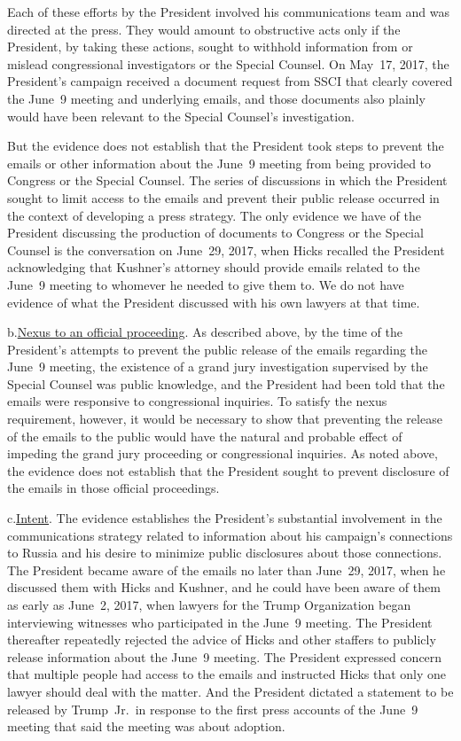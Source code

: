 Each of these efforts by the President involved his communications team and was directed at the press.
They would amount to obstructive acts only if the President, by taking these actions, sought to withhold information from or mislead congressional investigators or the Special Counsel.
On May~17, 2017, the President's campaign received a document request from SSCI that clearly covered the June~9 meeting and underlying emails, and those documents also plainly would have been relevant to the Special Counsel's investigation.

But the evidence does not establish that the President took steps to prevent the emails or other information about the June~9 meeting from being provided to Congress or the Special Counsel.
The series of discussions in which the President sought to limit access to the emails and prevent their public release occurred in the context of developing a press strategy.
The only evidence we have of the President discussing the production of documents to Congress or the Special Counsel is the conversation on June~29, 2017, when Hicks recalled the President acknowledging that Kushner's attorney should provide emails related to the June~9 meeting to whomever he needed to give them to.
We do not have evidence of what the President discussed with his own lawyers at that time.

b.\qquad\underline{Nexus to an official proceeding}.
As described above, by the time of the President's attempts to prevent the public release of the emails regarding the June~9 meeting, the existence of a grand jury investigation supervised by the Special Counsel was public knowledge, and the President had been told that the emails were responsive to congressional inquiries.
To satisfy the nexus requirement, however, it would be necessary to show that preventing the release of the emails to the public would have the natural and probable effect of impeding the grand jury proceeding or congressional inquiries.
As noted above, the evidence does not establish that the President sought to prevent disclosure of the emails in those official proceedings.

c.\qquad\underline{Intent}.
The evidence establishes the President's substantial involvement in the communications strategy related to information about his campaign's connections to Russia and his desire to minimize public disclosures about those connections.
The President became aware of the emails no later than June~29, 2017, when he discussed them with Hicks and Kushner, and he could have been aware of them as early as June~2, 2017, when lawyers for the Trump Organization began interviewing witnesses who participated in the June~9 meeting.
The President thereafter repeatedly rejected the advice of Hicks and other staffers to publicly release information about the June~9 meeting.
The President expressed concern that multiple people had access to the emails and instructed Hicks that only one lawyer should deal with the matter.
And the President dictated a statement to be released by Trump~Jr.\ in response to the first press accounts of the June~9 meeting that said the meeting was about adoption.

